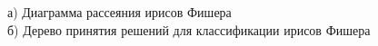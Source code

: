 \documentclass[a4paper,14pt]{extarticle} %
\begin{document}
\begin{figure}[h]
\begin{minipage}[h]{0.49\linewidth}
\end{minipage}
\hfill
\begin{minipage}[h]{0.49\linewidth}
\end{minipage}
\caption{а) Диаграмма рассеяния ирисов Фишера \\ б) Дерево принятия решений для классификации ирисов Фишера}
\label{fig:Iris-Fisher}
\end{figure}
\end{document}
